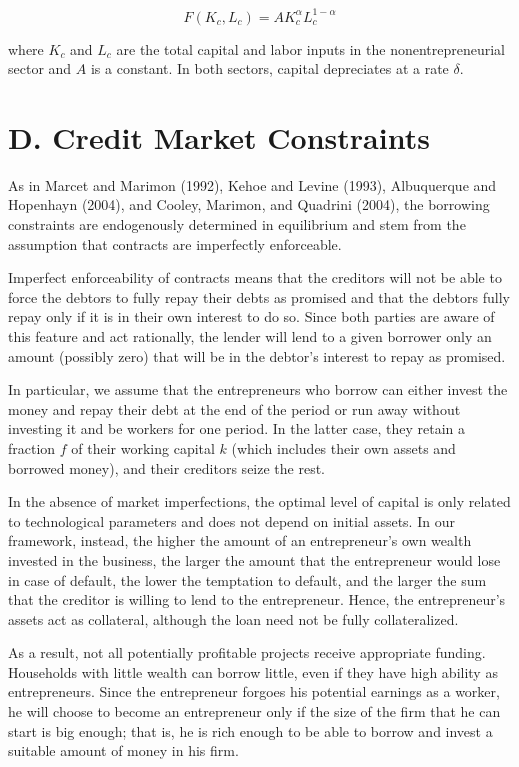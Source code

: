 \documentclass[10pt]{article}
\begin{document}
\begin{equation*}
F\left(K_{c}, L_{c}\right)=A K_{c}^{\alpha} L_{c}^{1-\alpha} \tag{1}
\end{equation*}


where $K_{c}$ and $L_{c}$ are the total capital and labor inputs in the nonentrepreneurial sector and $A$ is a constant. In both sectors, capital depreciates at a rate $\delta$.

\section*{D. Credit Market Constraints}
As in Marcet and Marimon (1992), Kehoe and Levine (1993), Albuquerque and Hopenhayn (2004), and Cooley, Marimon, and Quadrini (2004), the borrowing constraints are endogenously determined in equilibrium and stem from the assumption that contracts are imperfectly enforceable.

Imperfect enforceability of contracts means that the creditors will not be able to force the debtors to fully repay their debts as promised and that the debtors fully repay only if it is in their own interest to do so. Since both parties are aware of this feature and act rationally, the lender will lend to a given borrower only an amount (possibly zero) that will be in the debtor's interest to repay as promised.

In particular, we assume that the entrepreneurs who borrow can either invest the money and repay their debt at the end of the period or run away without investing it and be workers for one period. In the latter case, they retain a fraction $f$ of their working capital $k$ (which includes their own assets and borrowed money), and their creditors seize the rest.

In the absence of market imperfections, the optimal level of capital is only related to technological parameters and does not depend on initial assets. In our framework, instead, the higher the amount of an entrepreneur's own wealth invested in the business, the larger the amount that the entrepreneur would lose in case of default, the lower the temptation to default, and the larger the sum that the creditor is willing to lend to the entrepreneur. Hence, the entrepreneur's assets act as collateral, although the loan need not be fully collateralized.

As a result, not all potentially profitable projects receive appropriate funding. Households with little wealth can borrow little, even if they have high ability as entrepreneurs. Since the entrepreneur forgoes his potential earnings as a worker, he will choose to become an entrepreneur only if the size of the firm that he can start is big enough; that is, he is rich enough to be able to borrow and invest a suitable amount of money in his firm.
\end{document}
